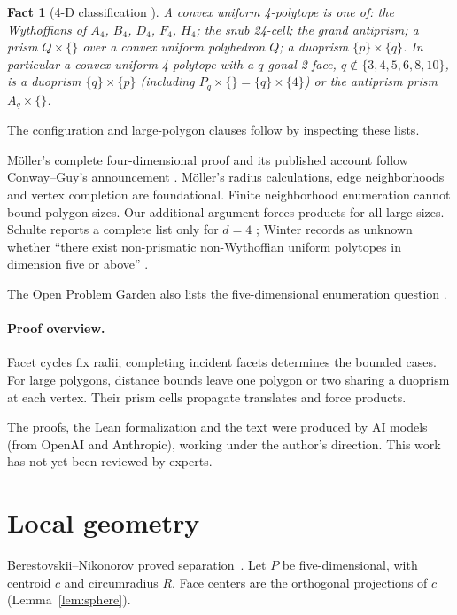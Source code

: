 \documentclass[11pt]{article}
\newtheorem{fact}[theorem]{Fact}
\theoremstyle{definition}
\theoremstyle{remark}
\begin{document}
\begin{fact}[4-D classification {\cite{ConwayGuy1965,Moller2004thesis}}]\label{fact:4d}
A convex uniform 4-polytope is one of: the Wythoffians of $A_4$, $B_4$,
$D_4$, $F_4$, $H_4$; the snub 24-cell; the grand antiprism; a prism
$Q\times\{\}$ over a convex uniform polyhedron $Q$; a duoprism
$\{p\}\times\{q\}$. In particular a convex uniform 4-polytope with a
$q$-gonal 2-face, $q\notin\{3,4,5,6,8,10\}$, is a duoprism
$\{q\}\times\{p\}$ (including $P_q\times\{\}=\{q\}\times\{4\}$) or the
antiprism prism $A_q\times\{\}$.
\end{fact}
The configuration and large-polygon clauses follow by inspecting these lists.

Möller's complete four-dimensional proof \cite[Section 1.1]{Moller2004thesis}
and its published account \cite{Moller2004} follow Conway--Guy's announcement
\cite[pp.~38--39]{ConwayGuy1965}. Möller's radius calculations, edge neighborhoods
and vertex completion \cite[Chapters 4--7 and 9]{Moller2004thesis}
are foundational. Finite neighborhood enumeration cannot bound polygon
sizes. Our additional argument forces products for all large sizes.
Schulte reports a complete list only for $d=4$
\cite[Section 18.5]{Schulte2017}; Winter records as unknown whether
``there exist non-prismatic non-Wythoffian uniform polytopes in dimension
five or above'' \cite[Appendix E.3, p.~167]{Winter2021}.

The Open Problem Garden also lists the five-dimensional enumeration question \cite{OPG}.

\paragraph{Proof overview.}
Facet cycles fix radii; completing incident facets determines the bounded cases. For large polygons, distance bounds
leave one polygon or two sharing a duoprism at each vertex.
Their prism cells propagate translates and force products.

The proofs, the Lean formalization and the text were produced by AI models
(from OpenAI and Anthropic), working under the author's direction.
This work has not yet been reviewed by experts.

\section{Local geometry}\label{sec:prelim}
Berestovskii--Nikonorov proved separation~\cite[Theorem~3.1]{BN2023}.
Let $P$ be five-dimensional, with centroid $c$ and circumradius $R$.
Face centers are the orthogonal projections of $c$
(Lemma~\ref{lem:sphere}).
\end{document}
